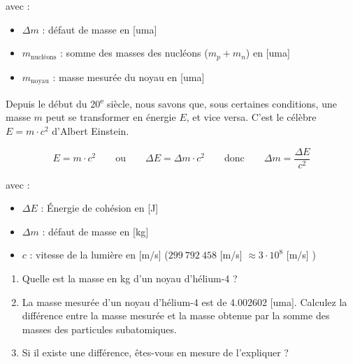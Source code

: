 \documentclass[
  11pt,
  french,
  a4paper,
  openany]{book}
\providecommand{\tightlist}{%
  \setlength{\itemsep}{0pt}\setlength{\parskip}{0pt}}
\begin{document}
avec :

\begin{itemize}
\tightlist
\item
  \(\Delta m\) : défaut de masse en {[}uma{]}\\
\item
  \(m_{\text{nucléons}}\) : somme des masses des nucléons (\(m_p + m_n\)) en {[}uma{]}\\
\item
  \(m_{\text{noyau}}\) : masse mesurée du noyau en {[}uma{]}
\end{itemize}

\clearpage

Depuis le début du 20\textsuperscript{e} siècle, nous savons que, sous certaines conditions, une masse \(m\) peut se transformer en énergie \(E\), et vice versa. C'est le célèbre \(E = m \cdot c^2\) d'Albert Einstein.

\[
E = m \cdot c^2 \qquad \text{ou} \qquad \Delta E = \Delta m \cdot c^2 \qquad \text{donc} \qquad \Delta m = \frac{\Delta E}{c^2}
\]

avec :

\begin{itemize}
\tightlist
\item
  \(\Delta E\) : Énergie de cohésion en {[}J{]}\\
\item
  \(\Delta m\) : défaut de masse en {[}kg{]}\\
\item
  \(c\) : vitesse de la lumière en {[}m/s{]} (\(299\ 792\ 458\) {[}m/s{]} \(\approx 3 \cdot 10^8\) {[}m/s{]} )
\end{itemize}

\begin{Exercise}

\begin{enumerate}
\def\labelenumi{\arabic{enumi}.}
\tightlist
\item
  Quelle est la masse en kg d'un noyau d'hélium-4 ?\\
\item
  La masse mesurée d'un noyau d'hélium-4 est de 4.002602 {[}uma{]}. Calculez la différence entre la masse mesurée et la masse obtenue par la somme des masses des particules subatomiques.
\item
  Si il existe une différence, êtes-vous en mesure de l'expliquer ?
\end{enumerate}


\end{Exercise}
\end{document}
